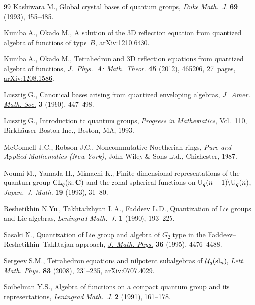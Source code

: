 \documentclass[pdftex]{sigma}
\begin{document}
\begin{thebibliography}{99}
Kashiwara M., Global crystal bases of quantum groups, \href{http://dx.doi.org/10.1215/S0012-7094-93-06920-7}{\textit{Duke Math.~J.}}
  \textbf{69} (1993), 455--485.

Kuniba A., Okado M., A solution of the 3D ref\/lection equation from quantized
  algebra of functions of type~$B$, \href{http://arxiv.org/abs/1210.6430}{arXiv:1210.6430}.

Kuniba A., Okado M., Tetrahedron and 3{D} ref\/lection equations from quantized
  algebra of functions, \href{http://dx.doi.org/10.1088/1751-8113/45/46/465206}{\textit{J.~Phys.~A: Math. Theor.}} \textbf{45} (2012),
  465206, 27~pages, \href{http://arxiv.org/abs/1208.1586}{arXiv:1208.1586}.

Lusztig G., Canonical bases arising from quantized enveloping algebras,
  \href{http://dx.doi.org/10.2307/1990961}{\textit{J.~Amer. Math. Soc.}} \textbf{3} (1990), 447--498.

Lusztig G., Introduction to quantum groups, \textit{Progress in Mathematics},
  Vol.~110, Birkh\"auser Boston Inc., Boston, MA, 1993.

McConnell J.C., Robson J.C., Noncommutative {N}oetherian rings, \textit{Pure and
  Applied Mathematics (New York)}, John Wiley \& Sons Ltd., Chichester, 1987.

Noumi M., Yamada H., Mimachi K., Finite-dimensional representations of the
  quantum group {${\rm GL}_q(n;{\bf C})$} and the zonal spherical functions on
  {${\rm U}_q(n-1)\backslash{\rm U}_q(n)$}, \textit{Japan.~J. Math.}
  \textbf{19} (1993), 31--80.

Reshetikhin N.Yu., Takhtadzhyan L.A., Faddeev L.D., Quantization of {L}ie groups
  and {L}ie algebras, \textit{Leningrad Math.~J.} \textbf{1} (1990), 193--225.

Sasaki N., Quantization of {L}ie group and algebra of {$G_2$} type in the
  {F}addeev--{R}eshetikhin--{T}akhtajan approach, \href{http://dx.doi.org/10.1063/1.531350}{\textit{J.~Math. Phys.}}
  \textbf{36} (1995), 4476--4488.

Sergeev S.M., Tetrahedron equations and nilpotent subalgebras of {${\mathcal
  U}_q({\rm sl}_n)$}, \href{http://dx.doi.org/10.1007/s11005-008-0219-x}{\textit{Lett. Math. Phys.}} \textbf{83} (2008), 231--235,
  \href{http://arxiv.org/abs/0707.4029}{arXiv:0707.4029}.

Soibelman Y.S., Algebra of functions on a compact quantum group and its
  representations, \textit{Leningrad Math.~J.} \textbf{2} (1991), 161--178.


\end{thebibliography}
\end{document}
